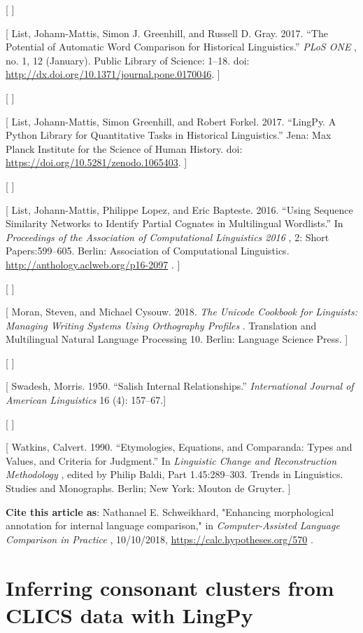 \documentclass[
  english,
  a4paper,
  oneside,tablecaptionabove
]{scrbook}
\begin{document}
{[} {]}

{[} List, Johann-Mattis, Simon J. Greenhill, and Russell D. Gray. 2017.
\enquote{The Potential of Automatic Word Comparison for Historical
Linguistics.} \emph{PLoS ONE} , no. 1, 12 (January). Public Library of
Science: 1--18. doi:
\href{https://doi.org/http://dx.doi.org/10.1371/journal.pone.0170046}{http://dx.doi.org/10.1371/journal.pone.0170046}.
{]}

{[} {]}

{[} List, Johann-Mattis, Simon Greenhill, and Robert Forkel. 2017.
\enquote{LingPy. A Python Library for Quantitative Tasks in Historical
Linguistics.} Jena: Max Planck Institute for the Science of Human
History. doi:
\href{https://doi.org/https://doi.org/10.5281/zenodo.1065403}{https://doi.org/10.5281/zenodo.1065403}.
{]}

{[} {]}

{[} List, Johann-Mattis, Philippe Lopez, and Eric Bapteste. 2016.
\enquote{Using Sequence Similarity Networks to Identify Partial Cognates
in Multilingual Wordlists.} In \emph{Proceedings of the Association of
Computational Linguistics 2016} , 2: Short Papers:599--605. Berlin:
Association of Computational Linguistics.
\url{http://anthology.aclweb.org/p16-2097} . {]}

{[} {]}

{[} Moran, Steven, and Michael Cysouw. 2018. \emph{The Unicode Cookbook
for Linguists: Managing Writing Systems Using Orthography Profiles} .
Translation and Multilingual Natural Language Processing 10. Berlin:
Language Science Press. {]}

{[} {]}

{[} Swadesh, Morris. 1950. \enquote{Salish Internal Relationships.}
\emph{International Journal of American Linguistics} 16 (4): 157--67.{]}

{[} {]}

{[} Watkins, Calvert. 1990. \enquote{Etymologies, Equations, and
Comparanda: Types and Values, and Criteria for Judgment.} In
\emph{Linguistic Change and Reconstruction Methodology} , edited by
Philip Baldi, Part 1.45:289--303. Trends in Linguistics. Studies and
Monographs. Berlin; New York: Mouton de Gruyter. {]}

\textbf{Cite this article as}: Nathanael E. Schweikhard, "Enhancing
morphological annotation for internal language comparison," in
\emph{Computer-Assisted Language Comparison in Practice} , 10/10/2018,
\url{https://calc.hypotheses.org/570} .

\hypertarget{inferring-consonant-clusters-from-clics-data-with-lingpy}{%
\chapter{Inferring consonant clusters from CLICS data with
LingPy}\label{inferring-consonant-clusters-from-clics-data-with-lingpy}}
\end{document}
